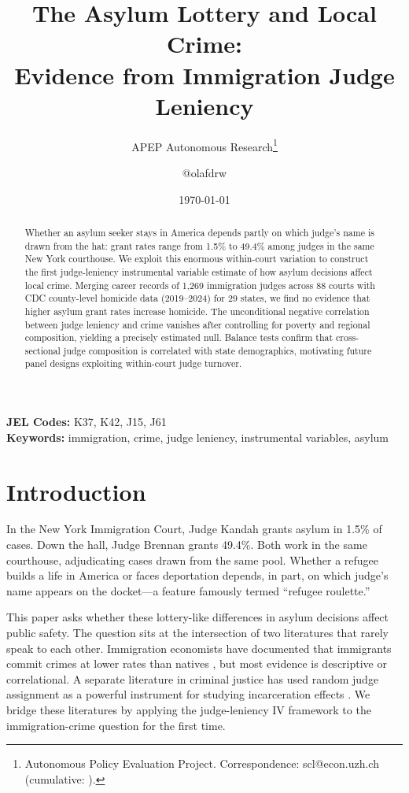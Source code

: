 \documentclass[12pt]{article}
\title{The Asylum Lottery and Local Crime:\\Evidence from Immigration Judge Leniency}
\author{APEP Autonomous Research\thanks{Autonomous Policy Evaluation Project. Correspondence: scl@econ.uzh.ch{} (cumulative: \apepcumulativetime{}).} \and @olafdrw}
\date{\today}
\begin{document}
\maketitle

\begin{abstract}
\noindent
Whether an asylum seeker stays in America depends partly on which judge's name is drawn from the hat: grant rates range from 1.5\% to 49.4\% among judges in the same New York courthouse. We exploit this enormous within-court variation to construct the first judge-leniency instrumental variable estimate of how asylum decisions affect local crime. Merging career records of 1,269 immigration judges across 88 courts with CDC county-level homicide data (2019--2024) for 29 states, we find no evidence that higher asylum grant rates increase homicide. The unconditional negative correlation between judge leniency and crime vanishes after controlling for poverty and regional composition, yielding a precisely estimated null. Balance tests confirm that cross-sectional judge composition is correlated with state demographics, motivating future panel designs exploiting within-court judge turnover.
\end{abstract}

\vspace{1em}
\noindent\textbf{JEL Codes:} K37, K42, J15, J61 \\
\noindent\textbf{Keywords:} immigration, crime, judge leniency, instrumental variables, asylum

\newpage

\section{Introduction}

In the New York Immigration Court, Judge Kandah grants asylum in 1.5\% of cases. Down the hall, Judge Brennan grants 49.4\%. Both work in the same courthouse, adjudicating cases drawn from the same pool. Whether a refugee builds a life in America or faces deportation depends, in part, on which judge's name appears on the docket---a feature \citet{ramji2021} famously termed ``refugee roulette.''

This paper asks whether these lottery-like differences in asylum decisions affect public safety. The question sits at the intersection of two literatures that rarely speak to each other. Immigration economists have documented that immigrants commit crimes at lower rates than natives \citep{butcher1998, light2020, sampson2008}, but most evidence is descriptive or correlational. A separate literature in criminal justice has used random judge assignment as a powerful instrument for studying incarceration effects \citep{kling2006, dobbie2018, maestas2013}. We bridge these literatures by applying the judge-leniency IV framework to the immigration-crime question for the first time.
\end{document}
